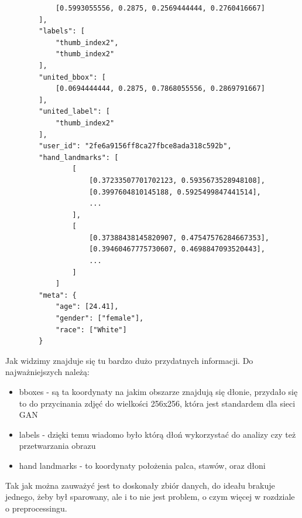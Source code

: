 \documentclass[12pt]{article}
\begin{document}
\begin{sloppypar}
{{\begin{lstlisting}
            [0.5993055556, 0.2875, 0.2569444444, 0.2760416667]
        ],
        "labels": [
            "thumb_index2",
            "thumb_index2"
        ],
        "united_bbox": [
            [0.0694444444, 0.2875, 0.7868055556, 0.2869791667]
        ],
        "united_label": [
            "thumb_index2"
        ],
        "user_id": "2fe6a9156ff8ca27fbce8ada318c592b",
        "hand_landmarks": [
                [
                    [0.37233507701702123, 0.5935673528948108],
                    [0.3997604810145188, 0.5925499847441514],
                    ...
                ],
                [
                    [0.37388438145820907, 0.47547576284667353],
                    [0.39460467775730607, 0.4698847093520443],
                    ...
                ]
            ]
        "meta": {
            "age": [24.41],
            "gender": ["female"],
            "race": ["White"]
        }
    \end{lstlisting}
    Jak widzimy znajduje się tu bardzo dużo przydatnych informacji. Do najważniejszych należą:
    \begin{itemize}
      \item bboxes - są ta koordynaty na jakim obszarze znajdują się dłonie, przydało się to do przycinania zdjęć do wielkości 256x256, która jest standardem dla sieci GAN
      \item labels - dzięki temu wiadomo było którą dłoń wykorzystać do analizy czy też przetwarzania obrazu
      \item hand landmarks - to koordynaty położenia palca, stawów, oraz dłoni
    \end{itemize}
    Tak jak można zauważyć jest to doskonały zbiór danych, do ideału brakuje jednego, żeby był sparowany, ale i to nie jest problem, o czym więcej w rozdziale o preprocessingu. 
    }
}
\end{sloppypar}
\end{document}

